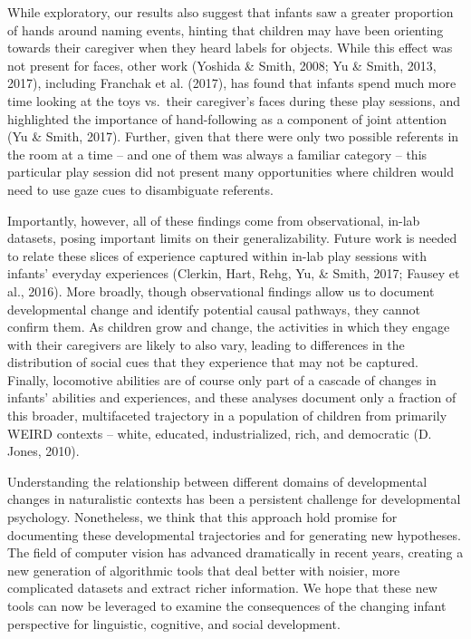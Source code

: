\documentclass[english,man]{apa6}
\begin{document}
While exploratory, our results also suggest that infants saw a greater
proportion of hands around naming events, hinting that children may have
been orienting towards their caregiver when they heard labels for
objects. While this effect was not present for faces, other work
(Yoshida \& Smith, 2008; Yu \& Smith, 2013, 2017), including Franchak et
al. (2017), has found that infants spend much more time looking at the
toys vs.~their caregiver's faces during these play sessions, and
highlighted the importance of hand-following as a component of joint
attention (Yu \& Smith, 2017). Further, given that there were only two
possible referents in the room at a time -- and one of them was always a
familiar category -- this particular play session did not present many
opportunities where children would need to use gaze cues to disambiguate
referents.

Importantly, however, all of these findings come from observational,
in-lab datasets, posing important limits on their generalizability.
Future work is needed to relate these slices of experience captured
within in-lab play sessions with infants' everyday experiences (Clerkin,
Hart, Rehg, Yu, \& Smith, 2017; Fausey et al., 2016). More broadly,
though observational findings allow us to document developmental change
and identify potential causal pathways, they cannot confirm them. As
children grow and change, the activities in which they engage with their
caregivers are likely to also vary, leading to differences in the
distribution of social cues that they experience that may not be
captured. Finally, locomotive abilities are of course only part of a
cascade of changes in infants' abilities and experiences, and these
analyses document only a fraction of this broader, multifaceted
trajectory in a population of children from primarily WEIRD contexts --
white, educated, industrialized, rich, and democratic (D. Jones, 2010).

Understanding the relationship between different domains of
developmental changes in naturalistic contexts has been a persistent
challenge for developmental psychology. Nonetheless, we think that this
approach hold promise for documenting these developmental trajectories
and for generating new hypotheses. The field of computer vision has
advanced dramatically in recent years, creating a new generation of
algorithmic tools that deal better with noisier, more complicated
datasets and extract richer information. We hope that these new tools
can now be leveraged to examine the consequences of the changing infant
perspective for linguistic, cognitive, and social development.
\end{document}

